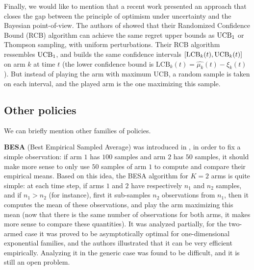 Finally, we would like to mention that a recent work \cite{KimTewari2019} presented an approach that closes the gap between the principle of optimism under uncertainty and the Bayesian point-of-view.
The authors of \cite{KimTewari2019} showed that their Randomized Confidence Bound (RCB) algorithm can achieve the same regret upper bounds as $\mathrm{UCB}_1$ or Thompson sampling, with uniform perturbations.
Their RCB algorithm ressembles $\mathrm{UCB}_1$, and builds the same confidence intervals $[ \mathrm{LCB}_k(t), \mathrm{UCB}_k(t) ]$ on arm $k$ at time $t$ (the lower confidence bound is $\mathrm{LCB}_k(t) = \widehat{\mu_k}(t) - \xi_k(t)$).
But instead of playing the arm with maximum UCB, a random sample is taken on each interval, and the played arm is the one maximizing this sample.


\subsection{Other policies}

We can briefly mention other families of policies.



\textbf{BESA} (Best Empirical Sampled Average) was introduced in \cite{Baransi2014}, in order to fix a simple observation:
if arm $1$ has $100$ samples and arm $2$ has $50$ samples, it should make more sense to only use $50$ samples of arm $1$ to compute and compare their empirical means.
Based on this idea, the BESA algorithm for $K=2$ arms is quite simple: at each time step, if arms $1$ and $2$ have respectively $n_1$ and $n_2$ samples, and if $n_1>n_2$ (for instance), first it sub-samples $n_2$ observations from $n_1$, then it computes the mean of these observations, and play the arm maximizing this mean (now that there is the same number of observations for both arms, it makes more sense to compare these quantities).
It was analyzed partially, for the two-armed case it was proved to be asymptotically optimal for one-dimensional exponential families, and the authors illustrated that it can be very efficient empirically.
Analyzing it in the generic case was found to be difficult, and it is still an open problem.


